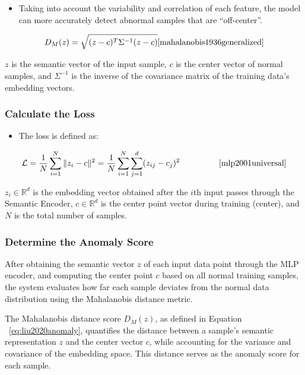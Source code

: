 \begin{ZhChapter}
\begin{itemize}
    \item Taking into account the variability and correlation of each feature, the model can more accurately detect abnormal samples that are ``off-center''.
\end{itemize}

\begin{equation}
    D_M(z) = \sqrt{(z - c)^T \Sigma^{-1} (z - c)} \tag*{\makebox[3.8cm][r]{\cite{mahalanobis1936generalized}}}
    \label{eq:mahalanobis}
\end{equation}

$z$ is the semantic vector of the input sample, $c$ is the center vector of normal samples, and $\Sigma^{-1}$ is the inverse of the covariance matrix of the training data's embedding vectors.


\subsubsection{Calculate the Loss}
\begin{itemize}
    \item The loss is defined as:
\end{itemize}

\begin{equation}
    \mathcal{L} = \frac{1}{N} \sum_{i=1}^{N} \| z_i - c \|^2
    = \frac{1}{N} \sum_{i=1}^{N} \sum_{j=1}^{d} (z_{ij} - c_j)^2 \tag*{\makebox[3.8cm][r]{\cite{mlp2001universal}}}
    \label{eq:centerloss}
\end{equation}

$z_i \in \mathbb{R}^d$ is the embedding vector obtained after the $i$th input passes through the Semantic Encoder,
$c \in \mathbb{R}^d$ is the center point vector during training (center), and $N$ is the total number of samples.



\subsubsection{Determine the Anomaly Score}
After obtaining the semantic vector $z$ of each input data point through the MLP encoder, and computing the center point $c$ based on all normal training samples, the system evaluates how far each sample deviates from the normal data distribution using the Mahalanobis distance metric.

The Mahalanobis distance score $D_M(z)$, as defined in Equation ~\ref{eq:liu2020anomaly}, quantifies the distance between a sample's semantic representation $z$ and the center vector $c$, while accounting for the variance and covariance of the embedding space. This distance serves as the anomaly score for each sample.


\end{ZhChapter}
